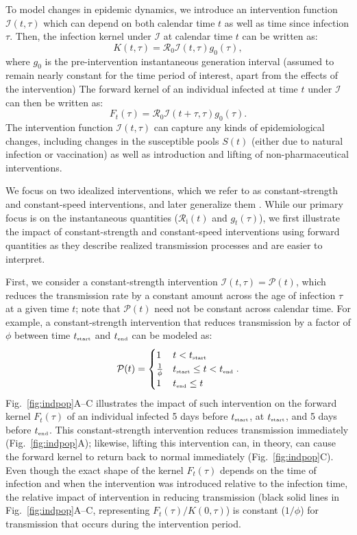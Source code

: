 \documentclass[12pt]{article}
\newcommand{\fref}[1]{Fig.~\ref{fig:#1}}
\newcommand{\Rx}[1]{\ensuremath{{\mathcal R}_{#1}}\xspace}
\newcommand{\Ro}{\Rx{0}}
\newcommand{\Ri}{\Rx{\mathrm{i}}}
\newcommand{\tsub}[2]{#1_{{\textrm{\tiny #2}}}}
\newcommand{\tstart}{\ensuremath{\tsub{t}{start}}\xspace}
\newcommand{\tend}{\ensuremath{\tsub{t}{end}}\xspace}
\newcommand{\PP}{\ensuremath{\mathcal P}}
\newcommand{\II}{\ensuremath{\mathcal I}}
\begin{document}
To model changes in epidemic dynamics, we introduce an intervention function $\II(t, \tau)$ which can depend on both calendar time $t$ as well as time since infection $\tau$. 
Then, the infection kernel under $\II$ at calendar time $t$ can be written as:
\begin{equation}
K(t, \tau) = \Ro \II(t, \tau) g_0(\tau),
\end{equation}
where $g_0$ is the pre-intervention instantaneous generation interval (assumed to remain nearly constant for the time period of interest, apart from the effects of the intervention)
The forward kernel of an individual infected at time $t$ under $\II$ can then be written as:
\begin{equation}
F_t(\tau) =  \Ro \II(t + \tau, \tau) g_0(\tau).
\end{equation}
The intervention function $\II(t, \tau)$ can capture any kinds of epidemiological changes, including changes in the susceptible pools $S(t)$ (either due to natural infection or vaccination) as well as introduction and lifting of non-pharmaceutical interventions.

We focus on two idealized interventions, which we refer to as constant-strength and constant-speed interventions, and later generalize them \citep{dushoff2021speed}.
While our primary focus is on the instantaneous quantities ($\Ri(t)$ and $g_t(\tau)$), we first illustrate the impact of constant-strength and constant-speed interventions using forward quantities as they describe realized transmission processes and are easier to interpret.

First, we consider a constant-strength intervention $\II(t, \tau) = \PP(t)$, which reduces the transmission rate by a constant amount across the age of infection $\tau$ at a given time $t$; note that $\PP(t)$ need not be constant across calendar time.
For example, a constant-strength intervention that reduces transmission by a factor of $\phi$ between time \tstart and \tend can be modeled as:
\begin{equation}
\PP(t) = \begin{cases}
1 & t < \tstart\\
\frac{1}{\phi} & \tstart \leq t < \tend\\
1 & \tend \leq t
\end{cases}.
\end{equation}
\fref{indpop}A--C illustrates the impact of such intervention on the forward kernel $F_t(\tau)$ of an individual infected 5 days before $\tstart$, at $\tstart$, and 5 days before $\tend$.
This constant-strength intervention reduces transmission immediately (\fref{indpop}A);
likewise, lifting this intervention can, in theory, can cause the forward kernel to return back to normal immediately (\fref{indpop}C).
Even though the exact shape of the kernel $F_t(\tau)$ depends on the time of infection and when the intervention was introduced relative to the infection time, the relative impact of intervention in reducing transmission (black solid lines in \fref{indpop}A--C, representing $F_t(\tau)/K(0, \tau)$) is constant ($1/\phi$) for transmission that occurs during the intervention period.
\end{document}
